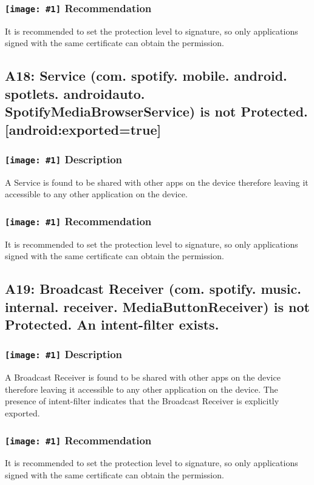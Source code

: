 \documentclass[12p]{article}
\newcommand{\icon}[1]{\texttt{[image: \#1]}}
\begin{document}
\subsubsection*{\protect\icon{/home/miki/Documents/GITHUB/AndroidPermissions/python/vulns/report_icons/basic_todo.png} Recommendation}
It is recommended to set the protection level to signature, so only applications signed with the same certificate can obtain the permission.
\subsection{A18: Service (com. spotify. mobile. android. spotlets. androidauto. SpotifyMediaBrowserService) is not Protected. [android:exported=true]}
\subsubsection*{\protect\icon{/home/miki/Documents/GITHUB/AndroidPermissions/python/vulns/report_icons/basic_sheet.png} Description}
A Service is found to be shared with other apps on the device therefore leaving it accessible to any other application on the device.
\subsubsection*{\protect\icon{/home/miki/Documents/GITHUB/AndroidPermissions/python/vulns/report_icons/basic_todo.png} Recommendation}
It is recommended to set the protection level to signature, so only applications signed with the same certificate can obtain the permission.
\subsection{A19: Broadcast Receiver (com. spotify. music. internal. receiver. MediaButtonReceiver) is not Protected. An intent-filter exists.}
\subsubsection*{\protect\icon{/home/miki/Documents/GITHUB/AndroidPermissions/python/vulns/report_icons/basic_sheet.png} Description}
A  Broadcast Receiver is found to be shared with other apps on the device therefore leaving it accessible to any other application on the device. The presence of intent-filter indicates that the Broadcast Receiver is explicitly exported.
\subsubsection*{\protect\icon{/home/miki/Documents/GITHUB/AndroidPermissions/python/vulns/report_icons/basic_todo.png} Recommendation}
It is recommended to set the protection level to signature, so only applications signed with the same certificate can obtain the permission.
\end{document}
